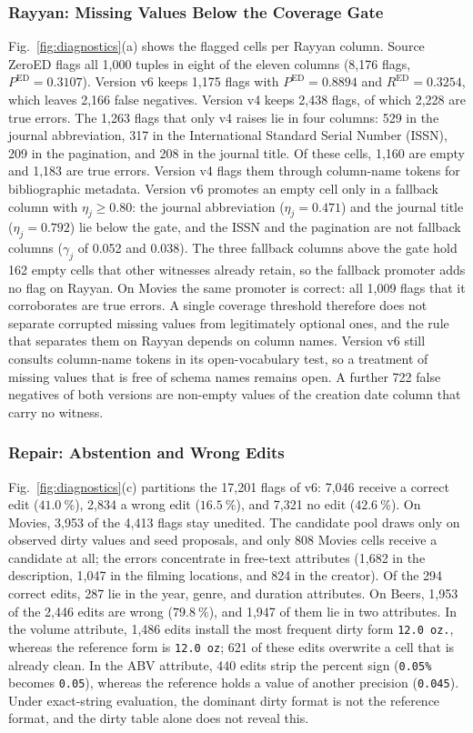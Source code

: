 \documentclass[conference]{IEEEtran}
\begin{document}
\subsubsection{Rayyan: Missing Values Below the Coverage Gate}
Fig.~\ref{fig:diagnostics}(a) shows the flagged cells per Rayyan column. Source ZeroED flags all 1,000 tuples in eight of the eleven columns (8,176 flags, $P^{\mathrm{ED}} = 0.3107$). Version v6 keeps 1,175 flags with $P^{\mathrm{ED}} = 0.8894$ and $R^{\mathrm{ED}} = 0.3254$, which leaves 2,166 false negatives. Version v4 keeps 2,438 flags, of which 2,228 are true errors. The 1,263 flags that only v4 raises lie in four columns: 529 in the journal abbreviation, 317 in the International Standard Serial Number (ISSN), 209 in the pagination, and 208 in the journal title. Of these cells, 1,160 are empty and 1,183 are true errors. Version v4 flags them through column-name tokens for bibliographic metadata. Version v6 promotes an empty cell only in a fallback column with $\eta_j \ge 0.80$: the journal abbreviation ($\eta_j = 0.471$) and the journal title ($\eta_j = 0.792$) lie below the gate, and the ISSN and the pagination are not fallback columns ($\gamma_j$ of 0.052 and 0.038). The three fallback columns above the gate hold 162 empty cells that other witnesses already retain, so the fallback promoter adds no flag on Rayyan. On Movies the same promoter is correct: all 1,009 flags that it corroborates are true errors. A single coverage threshold therefore does not separate corrupted missing values from legitimately optional ones, and the rule that separates them on Rayyan depends on column names. Version v6 still consults column-name tokens in its open-vocabulary test, so a treatment of missing values that is free of schema names remains open. A further 722 false negatives of both versions are non-empty values of the creation date column that carry no witness.

\subsubsection{Repair: Abstention and Wrong Edits}
Fig.~\ref{fig:diagnostics}(c) partitions the 17,201 flags of v6: 7,046 receive a correct edit ($41.0~\%$), 2,834 a wrong edit ($16.5~\%$), and 7,321 no edit ($42.6~\%$). On Movies, 3,953 of the 4,413 flags stay unedited. The candidate pool draws only on observed dirty values and seed proposals, and only 808 Movies cells receive a candidate at all; the errors concentrate in free-text attributes (1,682 in the description, 1,047 in the filming locations, and 824 in the creator). Of the 294 correct edits, 287 lie in the year, genre, and duration attributes. On Beers, 1,953 of the 2,446 edits are wrong ($79.8~\%$), and 1,947 of them lie in two attributes. In the volume attribute, 1,486 edits install the most frequent dirty form \texttt{12.0 oz.}, whereas the reference form is \texttt{12.0 oz}; 621 of these edits overwrite a cell that is already clean. In the ABV attribute, 440 edits strip the percent sign (\texttt{0.05\%} becomes \texttt{0.05}), whereas the reference holds a value of another precision (\texttt{0.045}). Under exact-string evaluation, the dominant dirty format is not the reference format, and the dirty table alone does not reveal this.
\end{document}
